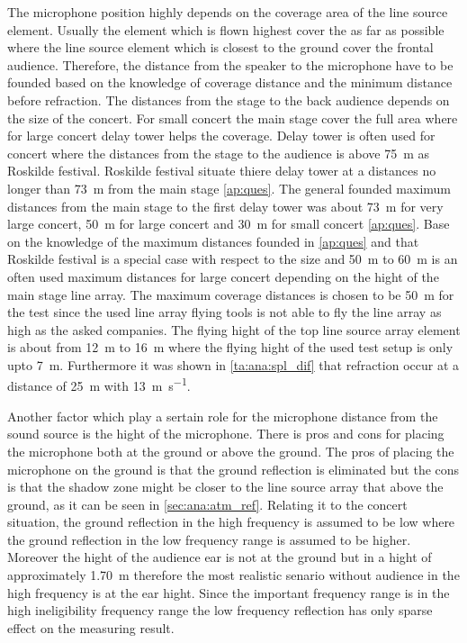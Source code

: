 The microphone position highly depends on the coverage area of the line source element. Usually the element which is flown highest cover the as far as possible where the line source element which is closest to the ground cover the frontal audience. Therefore, the distance from the speaker to the microphone have to be founded based on the knowledge of coverage distance and the minimum distance before refraction. The distances from the stage to the back audience depends on the size of the concert. For small concert the main stage cover the full area where for large concert delay tower helps the coverage. Delay tower is often used for concert where the distances from the stage to the audience is above \SI{75}{\meter} as Roskilde festival. Roskilde festival situate thiere delay tower at a distances no longer than \SI{73}{\meter} from the main stage \autoref{ap:ques}. The general founded maximum distances from the main stage to the first delay tower was about \SI{73}{\meter} for very large concert, \SI{50}{\meter} for large concert and \SI{30}{\meter} for small concert \autoref{ap:ques}. Base on the knowledge of the maximum distances founded in \autoref{ap:ques} and that Roskilde festival is a special case with respect to the size and \SI{50}{\meter} to \SI{60}{\meter} is an often used maximum distances for large concert depending on the hight of the main stage line array. The maximum coverage distances is chosen to be \SI{50}{\meter} for the test since the used line array flying tools is not able to fly the line array as high as the asked companies. The flying hight of the top line source array element is about from \SI{12}{\meter} to \SI{16}{\meter} where the flying hight of the used test setup is only upto \SI{7}{\meter}.  Furthermore it was shown in \autoref{ta:ana:spl_dif} that refraction occur at a distance of \SI{25}{\meter} with \SI{13}{\meter\per\second}.

Another factor which play a sertain role for the microphone distance from the sound source is the hight of the microphone. There is pros and cons for placing the microphone both at the ground or above the ground. The pros of placing the microphone on the ground is that the ground reflection is eliminated but the cons is that the shadow zone might be closer to the line source array that above the ground, as it can be seen in \autoref{sec:ana:atm_ref}. Relating it to the concert situation, the ground reflection in the high frequency is assumed to be low where the ground reflection in the low frequency range is assumed to be higher. Moreover the hight of the audience ear is not at the ground but in a hight of approximately \SI{1.70}{\meter} therefore the most realistic senario without audience in the high frequency is at the ear hight. Since the important frequency range is in the high ineligibility frequency range the low frequency reflection has only sparse effect on the measuring result. 

